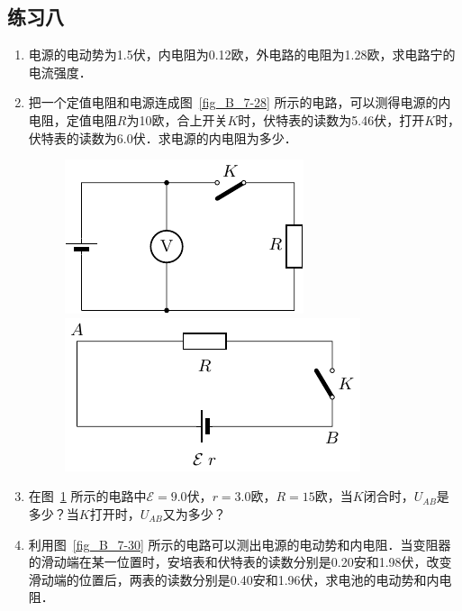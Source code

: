 \subsection*{练习八}
\begin{enumerate}
    \item 电源的电动势为1.5伏，内电阻为0.12欧，外电路的电阻为1.28欧，求电路宁的电流强度．
    \item 把一个定值电阻和电源连成图~\ref{fig_B_7-28} 所示的电路，可以测得电源的内电阻，定值电阻$R$为10欧，合上开关$K$时，伏特表的读数为5.46伏，打开$K$时，伏特表的读数为6.0伏．求电源的内电阻为多少．
    \begin{figure}[htbp]
        \centering
        \begin{minipage}[t]{0.48\textwidth}
            \centering
            \includegraphics{fig/B/7-28.pdf}
            \caption{}\label{fig_B_7-28}
        \end{minipage}
        \begin{minipage}[t]{0.48\textwidth}
            \centering
            \includegraphics{fig/B/7-29.pdf}
            \caption{}\label{fig_B_7-29}
        \end{minipage}
    \end{figure}
    \item 在图~\ref{fig_B_7-29} 所示的电路中$\mathcal{E}=9.0$伏，$r=3.0$欧，$R=15$欧，当$K$闭合时，$U_{AB}$是多少？当$K$打开时，$U_{AB}$又为多少？
    \item 利用图~\ref{fig_B_7-30} 所示的电路可以测出电源的电动势和内电阻．当变阻器的滑动端在某一位置时，安培表和伏特表的读数分别是0.20安和1.98伏，改变滑动端的位置后，两表的读数分别是0.40安和1.96伏，求电池的电动势和内电阻．

\end{enumerate}
